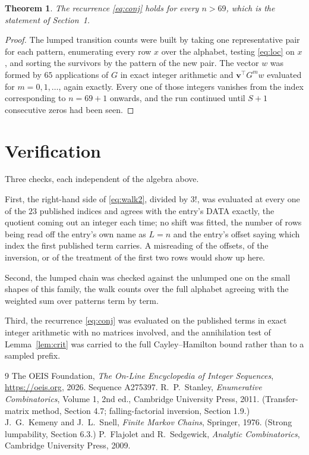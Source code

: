 \documentclass[11pt,a4paper]{article}
\theoremstyle{plain}
\newtheorem{theorem}{Theorem}
\theoremstyle{definition}
\begin{document}
\begin{theorem}
The recurrence \eqref{eq:conj} holds for every $n>69$, which is the statement of
Section~1.
\end{theorem}

\begin{proof}
The lumped transition counts were built by taking one representative pair for each pattern,
enumerating every row $x$ over the alphabet, testing \eqref{eq:loc} on $x$, and sorting
the survivors by the pattern of the new pair. The vector $w$ was formed by $65$
applications of $G$ in exact integer arithmetic and $\mathbf{v}^{\!\top}G^{m}w$
evaluated for $m=0,1,\dots$, again exactly. Every one of those integers vanishes from the
index corresponding to $n=69+1$ onwards, and the run continued until $S+1$ consecutive
zeros had been seen.
\end{proof}

\section{Verification}

Three checks, each independent of the algebra above.

First, the right-hand side of \eqref{eq:walk2}, divided by $3!$, was evaluated at every
one of the $23$ published indices and agrees with the entry's DATA exactly, the quotient
coming out an integer each time; no shift was fitted, the number of rows being read off the
entry's own name as $L=n$ and the entry's offset saying which index the first published
term carries. A misreading of the offsets, of the inversion, or of the treatment of the first
two rows would show up here.

Second, the lumped chain was checked against the unlumped one on the small shapes of this
family, the walk counts over the full alphabet agreeing with the weighted sum over patterns
term by term.

Third, the recurrence \eqref{eq:conj} was evaluated on the published terms in exact integer
arithmetic with no matrices involved, and the annihilation test of Lemma~\ref{lem:crit} was
carried to the full Cayley--Hamilton bound rather than to a sampled prefix.

\begin{thebibliography}{9}
 The OEIS Foundation, \emph{The On-Line Encyclopedia of Integer
Sequences}, \url{https://oeis.org}, 2026. Sequence A275397.
 R.~P.~Stanley, \emph{Enumerative Combinatorics}, Volume 1, 2nd ed.,
Cambridge University Press, 2011. (Transfer-matrix method, Section 4.7; falling-factorial
inversion, Section 1.9.)
 J.~G.~Kemeny and J.~L.~Snell, \emph{Finite Markov Chains}, Springer,
1976. (Strong lumpability, Section 6.3.)
 P.~Flajolet and R.~Sedgewick, \emph{Analytic Combinatorics}, Cambridge
University Press, 2009.
\end{thebibliography}
\end{document}
